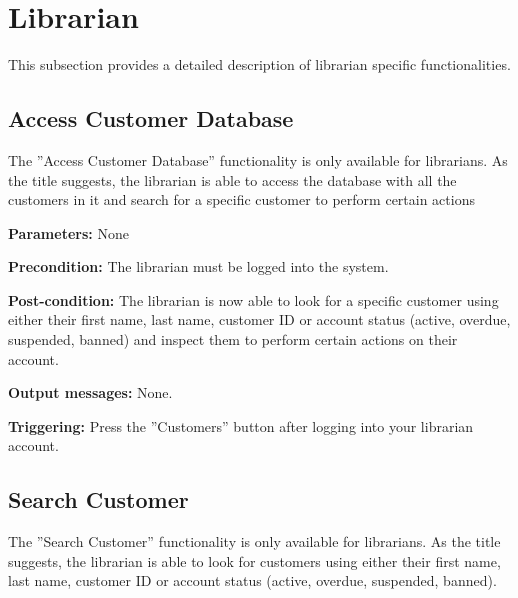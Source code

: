 \section{Librarian}
\label{operation:Librarian}

This subsection provides a detailed description of librarian specific
functionalities.

\subsection{Access Customer Database}

The ''Access Customer Database'' functionality is only available for
librarians. As the title suggests, the librarian is able to access the database
with all the customers in it and search for a specific customer to perform
certain actions

\begin{description}

\item \textbf{Parameters:} None

\item \textbf{Precondition:} The librarian must be logged into the system.

\item \textbf{Post-condition:} The librarian is now able to look for a specific
customer using either their first name, last name, customer ID or account status
(active, overdue, suspended, banned) and inspect them to perform certain actions
on their account.

\item \textbf{Output messages:} None.

\item \textbf{Triggering:} Press the ''Customers'' button after logging into
your librarian account.

\end{description}

\subsection{Search Customer}

The ''Search Customer'' functionality is only available for librarians. As the
title suggests, the librarian is able to look for customers using either their
first name, last name, customer ID or account status (active, overdue, suspended, banned).

